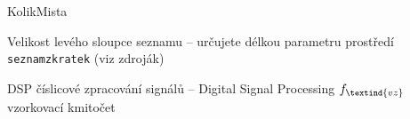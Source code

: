 \begin{seznamzkratek}{KolikMista}

		{Velikost levého sloupce seznamu}								%
		{-- určujete délkou parametru prostředí \texttt{seznamzkratek} (viz zdroják)}

		{DSP}								%
		{číslicové zpracování signálů -- Digital Signal Processing}
		{\ensuremath{f_\textind{vz}}} %
		{vzorkovací kmitočet}					%

\end{seznamzkratek}
